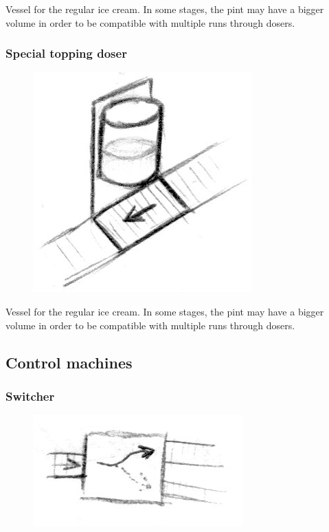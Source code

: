 \documentclass[a4paper]{scrartcl}
\begin{document}
            Vessel for the regular ice cream. In some stages, the pint may have
            a bigger volume in order to be compatible with multiple runs through
            dosers.

        \subsubsection{Special topping doser}
            \begin{figure}
                \vspace{-20pt}
                \includegraphics[scale=1]{devices/special_topping_doser}
                \vspace{-20pt}
            \end{figure}
            
            Vessel for the regular ice cream. In some stages, the pint may have
            a bigger volume in order to be compatible with multiple runs through
            dosers.

    \subsection{Control machines}
        \subsubsection{Switcher}
            \begin{figure}
                \vspace{-20pt}
                \includegraphics[scale=1]{devices/switcher}
                \vspace{-20pt}
            \end{figure}
            
\end{document}
